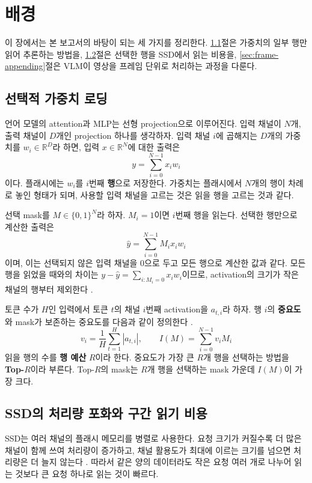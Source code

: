 \chapter{배경}\label{chap:background}

이 장에서는 본 보고서의 바탕이 되는 세 가지를 정리한다. \ref{sec:sparsification}절은 가중치의 일부 행만 읽어 추론하는 방법을, \ref{sec:chunk-cost}절은 선택한 행을 SSD에서 읽는 비용을, \ref{sec:frame-appending}절은 VLM이 영상을 프레임 단위로 처리하는 과정을 다룬다.

\section{선택적 가중치 로딩}\label{sec:sparsification}

언어 모델의 attention과 MLP는 선형 projection으로 이루어진다. 입력 채널이 $N$개, 출력 채널이 $D$개인 projection 하나를 생각하자. 입력 채널 $i$에 곱해지는 $D$개의 가중치를 $w_i\in\mathbb R^D$라 하면, 입력 $x\in\mathbb R^N$에 대한 출력은
\[
y=\sum_{i=0}^{N-1}x_iw_i
\]
이다. 플래시에는 $w_i$를 $i$번째 \textbf{행}으로 저장한다. 가중치는 플래시에서 $N$개의 행이 차례로 놓인 형태가 되며, 사용할 입력 채널을 고르는 것은 읽을 행을 고르는 것과 같다.

선택 mask를 $M\in\{0,1\}^N$라 하자. $M_i=1$이면 $i$번째 행을 읽는다. 선택한 행만으로 계산한 출력은
\[
\hat y=\sum_{i=0}^{N-1}M_ix_iw_i
\]
이며, 이는 선택되지 않은 입력 채널을 0으로 두고 모든 행으로 계산한 값과 같다. 모든 행을 읽었을 때와의 차이는 $y-\hat y=\sum_{i:M_i=0}x_iw_i$이므로, activation의 크기가 작은 채널의 행부터 제외한다 \cite{alizadeh2024,liu2025}.

토큰 수가 $H$인 입력에서 토큰 $t$의 채널 $i$번째 activation을 $a_{t,i}$라 하자. 행 $i$의 \textbf{중요도}와 mask가 보존하는 중요도를 다음과 같이 정의한다 \cite{yang2025}.
\[
v_i=\frac1H\sum_{t=1}^{H}|a_{t,i}|,
\qquad
I(M)=\sum_{i=0}^{N-1}v_iM_i
\]
읽을 행의 수를 \textbf{행 예산} $R$이라 한다. 중요도가 가장 큰 $R$개 행을 선택하는 방법을 \textbf{Top-$R$}이라 부른다. Top-$R$의 mask는 $R$개 행을 선택하는 mask 가운데 $I(M)$이 가장 크다.

\section{SSD의 처리량 포화와 구간 읽기 비용}\label{sec:chunk-cost}

SSD는 여러 채널의 플래시 메모리를 병렬로 사용한다. 요청 크기가 커질수록 더 많은 채널이 함께 쓰여 처리량이 증가하고, 채널 활용도가 최대에 이르는 크기를 넘으면 처리량은 더 늘지 않는다 \cite{jeong2013}. 따라서 같은 양의 데이터라도 작은 요청 여러 개로 나누어 읽는 것보다 큰 요청 하나로 읽는 것이 빠르다.

